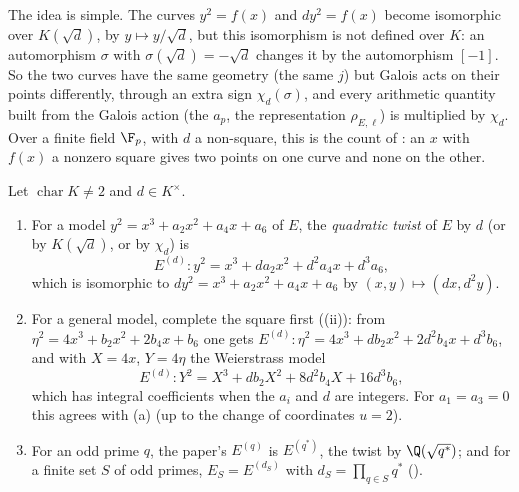The idea is simple. The curves $y^2=f(x)$ and $dy^2=f(x)$ become isomorphic over $K(\sqrt d)$, by $y\mapsto y/\sqrt d$, but this isomorphism is not defined over $K$:
an automorphism $\sigma$ with $\sigma(\sqrt d)=-\sqrt d$ changes it by the automorphism $[-1]$. So the two curves have the same geometry (the same $j$) but Galois acts on
their points differently, through an extra sign $\chi_d(\sigma)$, and every arithmetic quantity built from the Galois action (the $a_p$, the representation $\rho_{E,\ell}$) is
multiplied by $\chi_d$. Over a finite field $\F_p$, with $d$ a non-square, this is the count of : an $x$ with $f(x)$ a nonzero square gives two points on one curve and none
on the other.

\begin{definition}\label{def:ellcurves:twist}
Let $\operatorname{char}K\ne2$ and $d\in K^\times$.
\begin{enumerate}[label=(\alph*)]
\item For a model $y^2=x^3+a_2x^2+a_4x+a_6$ of $E$, the \emph{quadratic twist} of $E$ by $d$ (or by $K(\sqrt d)$, or by $\chi_d$) is
\[
E^{(d)}\colon y^2=x^3+da_2x^2+d^2a_4x+d^3a_6 ,
\]
which is isomorphic to $dy^2=x^3+a_2x^2+a_4x+a_6$ by $(x,y)\mapsto(dx,d^2y)$.
\item For a general model, complete the square first ((ii)): from $\eta^2=4x^3+b_2x^2+2b_4x+b_6$ one gets $E^{(d)}\colon\eta^2=4x^3+db_2x^2+2d^2b_4x+d^3b_6$, and with
$X=4x$, $Y=4\eta$ the Weierstrass model
\[
E^{(d)}\colon Y^2=X^3+db_2X^2+8d^2b_4X+16d^3b_6,
\]
which has integral coefficients when the $a_i$ and $d$ are integers. For $a_1=a_3=0$ this agrees with (a) (up to the change of coordinates $u=2$).
\item For an odd prime $q$, the paper's $E^{(q)}$ is $E^{(q^*)}$, the twist by $\Q(\sqrt{q^*})$; and for a finite set $S$ of odd primes, $E_S=E^{(d_S)}$ with $d_S=\prod_{q\in S}q^*$
().
\end{enumerate}
\end{definition}

